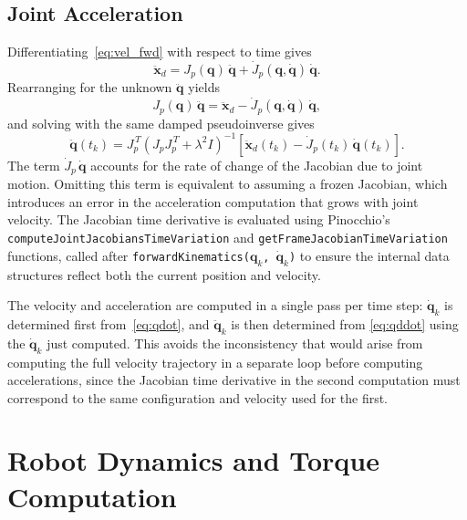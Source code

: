\documentclass[12pt,a4paper]{article}
\begin{document}
\subsection{Joint Acceleration}

Differentiating~\eqref{eq:vel_fwd} with respect to time gives
\begin{equation}
    \ddot{\bm{x}}_d = J_p(\bm{q})\,\ddot{\bm{q}}
                    + \dot{J}_p(\bm{q},\dot{\bm{q}})\,\dot{\bm{q}}.
    \label{eq:acc_fwd}
\end{equation}
Rearranging for the unknown $\ddot{\bm{q}}$ yields
\begin{equation}
    J_p(\bm{q})\,\ddot{\bm{q}} = \ddot{\bm{x}}_d - \dot{J}_p(\bm{q},\dot{\bm{q}})\,\dot{\bm{q}},
\end{equation}
and solving with the same damped pseudoinverse gives
\begin{equation}
    \ddot{\bm{q}}(t_k)
    = J_p^{\,T}\!\left(J_p J_p^{\,T} + \lambda^2 I\right)^{-1}
      \!\left[\ddot{\bm{x}}_d(t_k) - \dot{J}_p(t_k)\,\dot{\bm{q}}(t_k)\right].
    \label{eq:qddot}
\end{equation}
The term $\dot{J}_p\,\dot{\bm{q}}$ accounts for the rate of change of the Jacobian due to
joint motion. Omitting this term is equivalent to assuming a frozen Jacobian, which introduces
an error in the acceleration computation that grows with joint velocity. The Jacobian time
derivative is evaluated using Pinocchio's \texttt{computeJointJacobiansTimeVariation} and
\texttt{getFrameJacobianTimeVariation} functions, called after
\texttt{forwardKinematics($\bm{q}_k$, $\dot{\bm{q}}_k$)} to ensure the internal data
structures reflect both the current position and velocity.

The velocity and acceleration are computed in a single pass per time step: $\dot{\bm{q}}_k$
is determined first from~\eqref{eq:qdot}, and $\ddot{\bm{q}}_k$ is then determined from
\eqref{eq:qddot} using the $\dot{\bm{q}}_k$ just computed. This avoids the inconsistency
that would arise from computing the full velocity trajectory in a separate loop before
computing accelerations, since the Jacobian time derivative in the second computation must
correspond to the same configuration and velocity used for the first.

\section{Robot Dynamics and Torque Computation}
\end{document}
